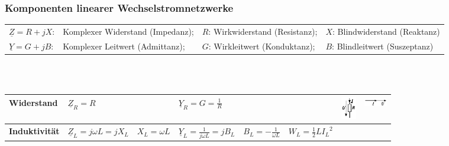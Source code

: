 	\subsubsection{Komponenten linearer Wechselstromnetzwerke}%
			\begin{tabular}{llll}
			$\underline{Z} = R +j X$: 
				& Komplexer Widerstand (Impedanz); 
				& $R$: Wirkwiderstand (Resistanz); 
				& $X$: Blindwiderstand (Reaktanz)\\
			$\underline{Y} = G + j B$: 
				& Komplexer Leitwert (Admittanz); 
				& $G$: Wirkleitwert (Konduktanz); 
				& $B$: Blindleitwert (Suszeptanz)
	      	\end{tabular} \\ \\
			\begin{tabular}{|l|l|l|l|l|l|ll|}
			\hline
				\textbf{Widerstand} & 
					\multicolumn{2}{l|}{$ \underline{Z}_R = R$} & \multicolumn{2}{l|}{$ \underline{Y}_R = G =\frac{1}{R}$} &
					&
					\parbox[c][0.8cm][c]{1cm}{\includegraphics[height=1cm,angle=90]{bilder/Wirkwiderstand.png}}&
                	\parbox[c][0.8cm][c]{1cm}{\includegraphics[width=1cm]{bilder/WirkwiderstandZeiger.png}} \\
			\hline	                    
				\textbf{Induktivität} &
					$ \underline{Z}_L = j \omega L = j X_L$&
					$ X_L = \omega L$ &
					$ \underline{Y}_L = \frac{1}{j \omega L} = j B_L$ & 
					$ B_L = - \frac{1}{\omega L}$ &
					$ W_L=\frac12 L {I_L}^2$  &
					

\end{tabular}
